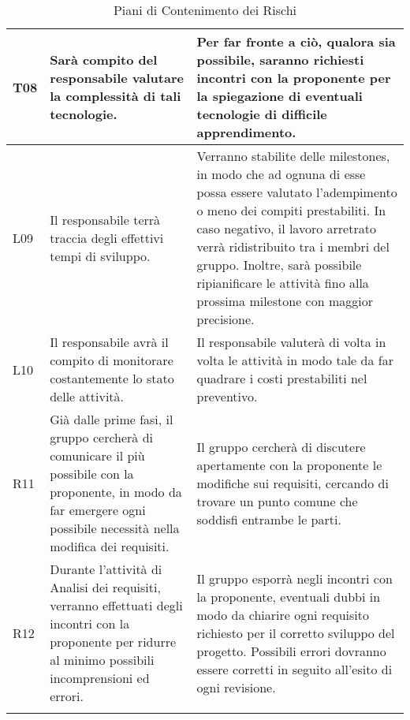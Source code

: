 \begin{longtable}{|C{.11\textwidth}|C{.40\textwidth}|C{.40\textwidth}|}
\hline
{}T08 & Sarà compito del responsabile valutare la complessità di tali tecnologie. & Per far fronte a ciò, qualora sia possibile, saranno richiesti incontri con la proponente per la spiegazione di eventuali tecnologie di difficile apprendimento.\\
\hline
L09 & Il responsabile terrà traccia degli effettivi tempi di sviluppo. & Verranno stabilite delle milestones, in modo che ad ognuna di esse possa essere valutato l'adempimento o meno dei compiti prestabiliti. In caso negativo, il lavoro arretrato verrà ridistribuito tra i membri del gruppo. Inoltre, sarà possibile ripianificare le attività fino alla prossima milestone con maggior precisione. \\
\hline
{}L10 & Il responsabile avrà il compito di monitorare costantemente lo stato delle attività. & Il responsabile valuterà di volta in volta le attività in modo tale da far quadrare i costi prestabiliti nel preventivo.\\
\hline
R11 & Già dalle prime fasi, il gruppo cercherà di comunicare il più possibile con la proponente, in modo da far emergere ogni possibile necessità nella modifica dei requisiti. & Il gruppo cercherà di discutere apertamente con la proponente le modifiche sui requisiti, cercando di trovare un punto comune che soddisfi entrambe le parti. \\
\hline
{}R12 & Durante l'attività di Analisi dei requisiti, verranno effettuati degli incontri con la proponente per ridurre al minimo possibili incomprensioni ed errori.  & Il gruppo esporrà negli incontri con la proponente, eventuali dubbi in modo da chiarire ogni requisito richiesto per il corretto sviluppo del progetto. Possibili errori dovranno essere corretti in seguito all'esito di ogni revisione.\\
\hline
\caption{Piani di Contenimento dei Rischi
\label{table:Contenimento Rischi}}
\end{longtable}
